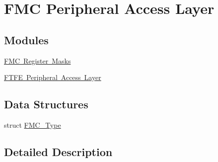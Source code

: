 \hypertarget{group___f_m_c___peripheral___access___layer}{}\section{F\+MC Peripheral Access Layer}
\label{group___f_m_c___peripheral___access___layer}
\subsection*{Modules}
\begin{DoxyCompactItemize}
\item 
\mbox{\hyperlink{group___f_m_c___register___masks}{F\+M\+C Register Masks}}
\item 
\mbox{\hyperlink{group___f_t_f_e___peripheral___access___layer}{F\+T\+F\+E Peripheral Access Layer}}
\end{DoxyCompactItemize}
\subsection*{Data Structures}
\begin{DoxyCompactItemize}
\item 
struct \mbox{\hyperlink{struct_f_m_c___type}{F\+M\+C\+\_\+\+Type}}
\end{DoxyCompactItemize}


\subsection{Detailed Description}
